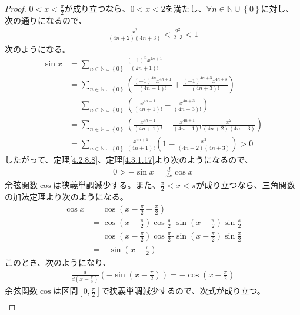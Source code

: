 \documentclass[dvipdfmx]{jsarticle}
\begin{document}
\begin{proof}
$0 < x < \frac{\pi}{2}$が成り立つなら、$0 < x < 2$を満たし、$\forall n \in \mathbb{N} \cup \left\{ 0 \right\}$に対し、次の通りになるので、
\begin{align*}
\frac{x^{2}}{(4n + 2)(4n + 3)} < \frac{2^{2}}{2 \cdot 3} < 1
\end{align*}
次のようになる。
\begin{align*}
\sin x &= \sum_{n \in \mathbb{N} \cup \left\{ 0 \right\}} \frac{( - 1)^{n}x^{2n + 1}}{(2n + 1)!}\\
&= \sum_{n \in \mathbb{N} \cup \left\{ 0 \right\}} \left( \frac{( - 1)^{4n}x^{4n + 1}}{(4n + 1)!} + \frac{( - 1)^{4n + 3}x^{4n + 3}}{(4n + 3)!} \right)\\
&= \sum_{n \in \mathbb{N} \cup \left\{ 0 \right\}} \left( \frac{x^{4n + 1}}{(4n + 1)!} - \frac{x^{4n + 3}}{(4n + 3)!} \right)\\
&= \sum_{n \in \mathbb{N} \cup \left\{ 0 \right\}} \left( \frac{x^{4n + 1}}{(4n + 1)!} - \frac{x^{4n + 1}}{(4n + 1)!}\frac{x^{2}}{(4n + 2)(4n + 3)} \right)\\
&= \sum_{n \in \mathbb{N} \cup \left\{ 0 \right\}} {\frac{x^{4n + 1}}{(4n + 1)!}\left( 1 - \frac{x^{2}}{(4n + 2)(4n + 3)} \right)} > 0
\end{align*}
したがって、定理\ref{4.2.8.8}、定理\ref{4.3.1.17}より次のようになるので、
\begin{align*}
0 > - \sin x = \frac{d}{dx}\cos x
\end{align*}
余弦関数$\cos$は狭義単調減少する。また、$\frac{\pi}{2} < x < \pi$が成り立つなら、三角関数の加法定理より次のようになる。
\begin{align*}
\cos x &= \cos\left( x - \frac{\pi}{2} + \frac{\pi}{2} \right)\\
&= \cos\left( x - \frac{\pi}{2} \right)\cos\frac{\pi}{2}\text{-}\sin\left( x - \frac{\pi}{2} \right)\sin\frac{\pi}{2}\\
&= \cos\left( x - \frac{\pi}{2} \right)\cos\frac{\pi}{2}\text{-}\sin\left( x - \frac{\pi}{2} \right)\sin\frac{\pi}{2}\\
&= -\sin\left( x - \frac{\pi}{2} \right)
\end{align*}
このとき、次のようになり、
\begin{align*}
\frac{d}{d\left( x - \frac{\pi}{2} \right)}\left( - \sin\left( x - \frac{\pi}{2} \right) \right) = - \cos\left( x - \frac{\pi}{2} \right)
\end{align*}
余弦関数$\cos$は区間$\left[ 0,\frac{\pi}{2} \right]$で狭義単調減少するので、次式が成り立つ。
\begin{align*}

\end{align*}
\end{proof}
\end{document}
